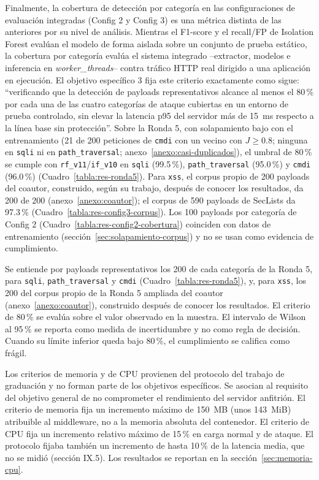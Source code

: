 Finalmente, la cobertura de detección por categoría en las configuraciones de evaluación integradas (Config 2 y Config 3) es una métrica distinta de las anteriores por su nivel de análisis. Mientras el F1-score y el recall/FP de Isolation Forest evalúan el modelo de forma aislada sobre un conjunto de prueba estático, la cobertura por categoría evalúa el sistema integrado --extractor, modelos e inferencia en \textit{worker\_threads}-- contra tráfico HTTP real dirigido a una aplicación en ejecución. El objetivo específico 3 fija este criterio exactamente como sigue: ``verificando que la detección de payloads representativos alcance al menos el 80\,\% por cada una de las cuatro categorías de ataque cubiertas en un entorno de prueba controlado, sin elevar la latencia p95 del servidor más de 15~ms respecto a la línea base sin protección''. Sobre la Ronda 5, con solapamiento bajo con el entrenamiento (21 de 200 peticiones de \texttt{cmdi} con un vecino con $J \geq 0.8$; ninguna en \texttt{sqli} ni en \texttt{path\_traversal}; anexo~\ref{anexo:casi-duplicados}), el umbral de 80\,\% se cumple con \texttt{rf\_v11}/\texttt{if\_v10} en \texttt{sqli} (99.5\,\%), \texttt{path\_traversal} (95.0\,\%) y \texttt{cmdi} (96.0\,\%) (Cuadro~\ref{tabla:res-ronda5}). Para \texttt{xss}, el corpus propio de 200 payloads del coautor, construido, según su trabajo, después de conocer los resultados, da 200 de 200 (anexo~\ref{anexo:coautor}); el corpus de 590 payloads de SecLists da 97.3\,\% (Cuadro~\ref{tabla:res-config3-corpus}). Los 100 payloads por categoría de Config 2 (Cuadro~\ref{tabla:res-config2-cobertura}) coinciden con datos de entrenamiento (sección~\ref{sec:solapamiento-corpus}) y no se usan como evidencia de cumplimiento.

Se entiende por payloads representativos los 200 de cada categoría de la Ronda 5, para \texttt{sqli}, \texttt{path\_traversal} y \texttt{cmdi} (Cuadro~\ref{tabla:res-ronda5}), y, para \texttt{xss}, los 200 del corpus propio de la Ronda 5 ampliada del coautor (anexo~\ref{anexo:coautor}), construido después de conocer los resultados. El criterio de 80\,\% se evalúa sobre el valor observado en la muestra. El intervalo de Wilson\parencite{wilson1927} al 95\,\% se reporta como medida de incertidumbre y no como regla de decisión. Cuando su límite inferior queda bajo 80\,\%, el cumplimiento se califica como frágil.

Los criterios de memoria y de CPU provienen del protocolo del trabajo de graduación y no forman parte de los objetivos específicos. Se asocian al requisito del objetivo general de no comprometer el rendimiento del servidor anfitrión. El criterio de memoria fija un incremento máximo de 150~MB (unos 143~MiB) atribuible al middleware, no a la memoria absoluta del contenedor. El criterio de CPU fija un incremento relativo máximo de 15\,\% en carga normal y de ataque. El protocolo fijaba también un incremento de hasta 10\,\% de la latencia media, que no se midió (sección IX.5). Los resultados se reportan en la sección~\ref{sec:memoria-cpu}.

